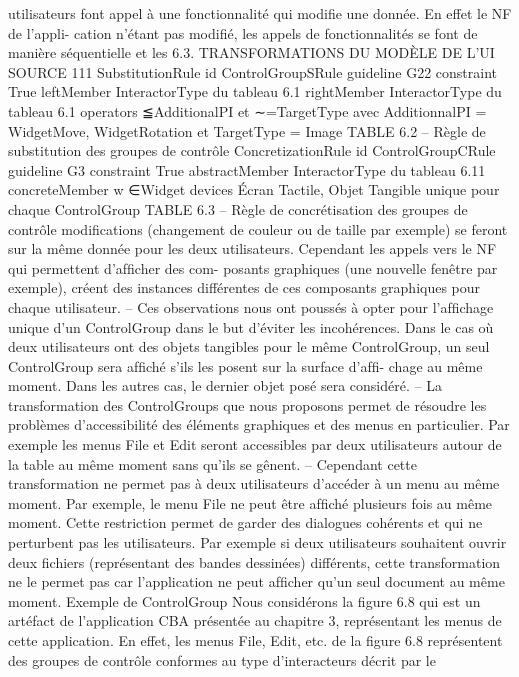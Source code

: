 \documentclass{article}
\begin{document}
utilisateurs font appel à une fonctionnalité qui modiﬁe une donnée. En effet le NF de l’appli-
cation n’étant pas modiﬁé, les appels de fonctionnalités se font de manière séquentielle et les
6.3. TRANSFORMATIONS DU MODÈLE DE L’UI SOURCE
111
SubstitutionRule
id
ControlGroupSRule
guideline
G22
constraint
True
leftMember
InteractorType du tableau 6.1
rightMember
InteractorType du tableau 6.1
operators
≦AdditionalPI et ∼=TargetType
avec AdditionnalPI = {WidgetMove, WidgetRotation}
et TargetType = {Image}
TABLE 6.2 – Règle de substitution des groupes de contrôle
ConcretizationRule
id
ControlGroupCRule
guideline
G3
constraint
True
abstractMember
InteractorType du tableau 6.11
concreteMember
w ∈{Widget}
devices
Écran Tactile, Objet Tangible unique pour chaque ControlGroup
TABLE 6.3 – Règle de concrétisation des groupes de contrôle
modiﬁcations (changement de couleur ou de taille par exemple) se feront sur la même donnée
pour les deux utilisateurs. Cependant les appels vers le NF qui permettent d’afﬁcher des com-
posants graphiques (une nouvelle fenêtre par exemple), créent des instances différentes de ces
composants graphiques pour chaque utilisateur.
– Ces observations nous ont poussés à opter pour l’afﬁchage unique d’un ControlGroup dans le
but d’éviter les incohérences. Dans le cas où deux utilisateurs ont des objets tangibles pour le
même ControlGroup, un seul ControlGroup sera afﬁché s’ils les posent sur la surface d’afﬁ-
chage au même moment. Dans les autres cas, le dernier objet posé sera considéré.
– La transformation des ControlGroups que nous proposons permet de résoudre les problèmes
d’accessibilité des éléments graphiques et des menus en particulier. Par exemple les menus File
et Edit seront accessibles par deux utilisateurs autour de la table au même moment sans qu’ils
se gênent.
– Cependant cette transformation ne permet pas à deux utilisateurs d’accéder à un menu au même
moment. Par exemple, le menu File ne peut être afﬁché plusieurs fois au même moment. Cette
restriction permet de garder des dialogues cohérents et qui ne perturbent pas les utilisateurs. Par
exemple si deux utilisateurs souhaitent ouvrir deux ﬁchiers (représentant des bandes dessinées)
différents, cette transformation ne le permet pas car l’application ne peut afﬁcher qu’un seul
document au même moment.
Exemple de ControlGroup
Nous considérons la ﬁgure 6.8 qui est un artéfact de l’application CBA
présentée au chapitre 3, représentant les menus de cette application. En effet, les menus File, Edit, etc.
de la ﬁgure 6.8 représentent des groupes de contrôle conformes au type d’interacteurs décrit par le
\end{document}
